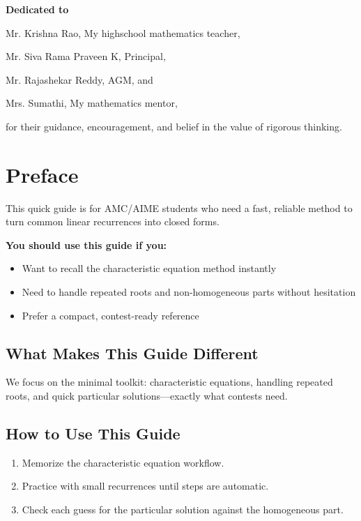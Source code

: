 \documentclass[12pt]{extarticle}
\begin{document}
\thispagestyle{empty}
\vspace*{\fill}
\begin{center}
\Large

\textbf{Dedicated to}

\vspace{1cm}

Mr. Krishna Rao, My highschool mathematics teacher,

Mr. Siva Rama Praveen K, Principal,

Mr. Rajashekar Reddy, AGM, and

Mrs. Sumathi, My mathematics mentor,

\vspace{1cm}

for their guidance, encouragement, and belief in the value of rigorous thinking.
\end{center}
\vspace*{\fill}

\newpage

	\tableofcontents
\newpage

\section*{Preface}

This quick guide is for AMC/AIME students who need a fast, reliable method to turn common linear recurrences into closed forms.

	\textbf{You should use this guide if you:}
\begin{itemize}
    \item Want to recall the characteristic equation method instantly
    \item Need to handle repeated roots and non-homogeneous parts without hesitation
    \item Prefer a compact, contest-ready reference
\end{itemize}

\subsection*{What Makes This Guide Different}
We focus on the minimal toolkit: characteristic equations, handling repeated roots, and quick particular solutions—exactly what contests need.

\subsection*{How to Use This Guide}
\begin{enumerate}
    \item Memorize the characteristic equation workflow.
    \item Practice with small recurrences until steps are automatic.
    \item Check each guess for the particular solution against the homogeneous part.
\end{enumerate}
\end{document}
